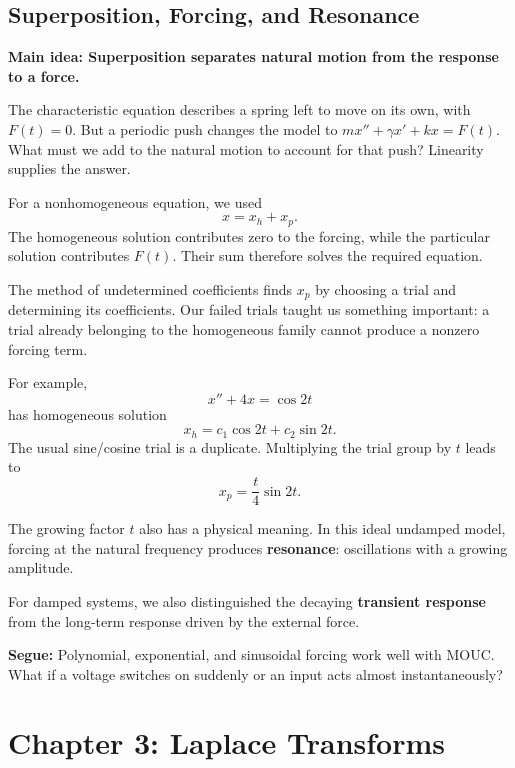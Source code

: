 \documentclass[11pt,letterpaper]{article}
\begin{document}

\subsection{Superposition, Forcing, and Resonance}
\textbf{Main idea: Superposition separates natural motion from the response to a force.}

The characteristic equation describes a spring
left to move on its own, with $F(t)=0$. But a
periodic push changes the model to
$mx''+\gamma x'+kx=F(t)$. What must we add to
the natural motion to account for that push?
Linearity supplies the answer.

For a nonhomogeneous equation, we used
\[
\boxed{x=x_h+x_p.}
\]
The homogeneous solution contributes zero to the
forcing, while the particular solution contributes
$F(t)$. Their sum therefore solves the required equation.

The method of undetermined coefficients finds $x_p$
by choosing a trial and determining its coefficients.
Our failed trials taught us something important:
a trial already belonging to the homogeneous family
cannot produce a nonzero forcing term.

For example,
\[
x''+4x=\cos2t
\]
has homogeneous solution
\[
x_h=c_1\cos2t+c_2\sin2t.
\]
The usual sine/cosine trial is a duplicate.
Multiplying the trial group by $t$ leads to
\[
x_p=\frac{t}{4}\sin2t.
\]

The growing factor $t$ also has a physical meaning.
In this ideal undamped model, forcing at the natural
frequency produces \textbf{resonance}: oscillations
with a growing amplitude.

For damped systems, we also distinguished the
decaying \textbf{transient response} from the
long-term response driven by the external force.

\textbf{Segue:} Polynomial, exponential, and sinusoidal
forcing work well with MOUC. What if a voltage
switches on suddenly or an input acts almost
instantaneously?

\section{Chapter 3: Laplace Transforms}
\end{document}
